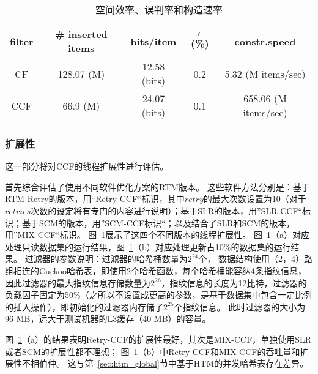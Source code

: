 \begin{table}[htbp]
  \centering
  \caption{空间效率、误判率和构造速率}
  \label{tab:cf_space}
  \begin{tabular}{ccccc}
    \toprule
      filter  & \# inserted items & bits/item & $\epsilon$ (\%)&  constr.speed  \\
    \midrule
      CF   &  128.07 (M) & 12.58 (bits) &  0.2       &  5.32 (M items/sec)  \\
      CCF  &  66.9 (M)  & 24.07 (bits)  &  0.1       &  658.06 (M items/sec) \\
    \bottomrule
  \end{tabular}
\end{table}

\subsubsection{扩展性}
这一部分将对CCF的线程扩展性进行评估。

首先综合评估了使用不同软件优化方案的RTM版本。
这些软件方法分别是：基于RTM Retry的版本，用“Retry-CCF“标识，其中$retry$的最大次数设置为10（对于$retries$次数的设定将有专门的内容进行说明）；基于SLR的版本，用”SLR-CCF“标识；基于SCM的版本，用”SCM-CCF标识“；以及结合了SLR和SCM的版本，用”MIX-CCF“标识。
图~\ref{fig:locks}展示了这四个不同版本的线程扩展性。
图~\ref{fig:locks}（a）对应处理只读数据集的运行结果，图~\ref{fig:locks}（b）对应处理更新占10\%的数据集的运行结果。
过滤器的参数说明：过滤器的哈希桶数量为$2^{24}$个，
数据结构使用（2，4）路组相连的Cuckoo哈希表，即使用2个哈希函数，每个哈希桶能容纳4条指纹信息，因此过滤器的最大指纹信息存储数量为$2^{26}$，指纹信息的长度为12比特，过滤器的负载因子固定为50\%（之所以不设置成更高的参数，是基于数据集中包含一定比例的插入操作），即初始化的过滤器内存储了$2^{25}$个指纹信息。
此时过滤器的大小为96 MB，远大于测试机器的L3缓存（40 MB）的容量。

\begin{figure}[htbp]
\centering
\label{fig:locks}
\end{figure}
图~\ref{fig:locks}（a）的结果表明Retry-CCF的扩展性最好，其次是MIX-CCF，单独使用SLR或者SCM的扩展性都不理想；
图~\ref{fig:locks}（b）中Retry-CCF和MIX-CCF的吞吐量和扩展性不相伯仲。
这与第~\ref{sec:htm_global}节中基于HTM的并发哈希表存在差异。

